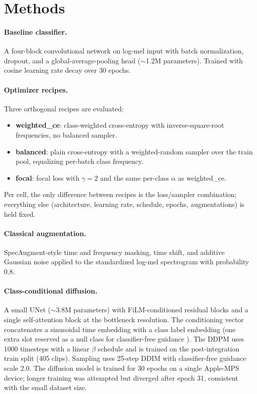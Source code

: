\documentclass[final]{article}
\begin{document}
\section{Methods}\label{sec:approach}
\paragraph{Baseline classifier.} A four-block convolutional network on log-mel input with batch normalization, dropout, and a global-average-pooling head ($\sim$1.2M parameters). Trained with cosine learning rate decay over 30 epochs.

\paragraph{Optimizer recipes.} Three orthogonal recipes are evaluated:
\begin{itemize}
    \item \textbf{weighted\_ce}: class-weighted cross-entropy with inverse-square-root frequencies, no balanced sampler.
    \item \textbf{balanced}: plain cross-entropy with a weighted-random sampler over the train pool, equalizing per-batch class frequency.
    \item \textbf{focal}: focal loss \cite{lin2017focal} with $\gamma=2$ and the same per-class $\alpha$ as weighted\_ce.
\end{itemize}
Per cell, the only difference between recipes is the loss/sampler combination; everything else (architecture, learning rate, schedule, epochs, augmentations) is held fixed.

\paragraph{Classical augmentation.} SpecAugment-style time and frequency masking, time shift, and additive Gaussian noise applied to the standardized log-mel spectrogram with probability 0.8.

\paragraph{Class-conditional diffusion.} A small UNet ($\sim$3.8M parameters) with FiLM-conditioned residual blocks and a single self-attention block at the bottleneck resolution. The conditioning vector concatenates a sinusoidal time embedding with a class label embedding (one extra slot reserved as a null class for classifier-free guidance \cite{ho2021classifier}). The DDPM uses 1000 timesteps with a linear $\beta$ schedule and is trained on the post-integration train split (405 clips). Sampling uses 25-step DDIM \cite{song2021ddim} with classifier-free guidance scale 2.0. The diffusion model is trained for 30 epochs on a single Apple-MPS device; longer training was attempted but diverged after epoch 31, consistent with the small dataset size.
\end{document}
